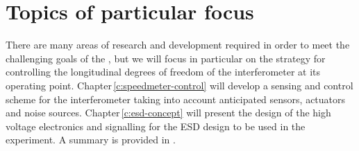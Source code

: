 % 
% 

\section{Topics of particular focus}
There are many areas of research and development required in order to meet the challenging goals of the \SSMEXPT{}, but we will focus in particular on the strategy for controlling the longitudinal degrees of freedom of the interferometer at its operating point. Chapter\,\ref{c:speedmeter-control} will develop a sensing and control scheme for the interferometer taking into account anticipated sensors, actuators and noise sources. Chapter\,\ref{c:esd-concept} will present the design of the high voltage electronics and signalling for the \gls{ESD} design to be used in the experiment. A summary is provided in .
